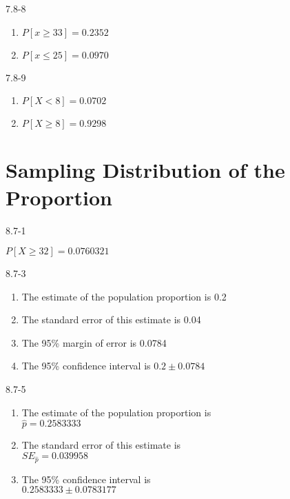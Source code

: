 \begin{exsol@solution}{7.8-8}



\begin{enumerate}
\item $P[ x \ge 33] = 0.2352$
\item $P[ x \le 25] = 0.0970$
\end{enumerate}

\end{exsol@solution}
\begin{exsol@solution}{7.8-9}
\begin{enumerate}
\item $P[ X < 8 ] = 0.0702$
\item $P[ X \ge 8 ] = 0.9298$
\end{enumerate}

\end{exsol@solution}
\setcounter{chapter}{7}\chapter{Sampling Distribution of the Proportion}
\begin{exsol@solution}{8.7-1}

    $P[ X \ge 32 ] = 0.0760321$
\end{exsol@solution}
\begin{exsol@solution}{8.7-3}
\begin{enumerate}
\item The estimate of the population proportion is 0.2
\item The standard error of this estimate is 0.04
\item The 95\% margin of error is 0.0784
\item The 95\% confidence interval is $0.2 \pm 0.0784$
\end{enumerate}

\end{exsol@solution}
\begin{exsol@solution}{8.7-5}
\begin{enumerate}
\item	The estimate of the population proportion is \\ $\hat{p} = 0.2583333$
\item	The standard error of this estimate is \\ $SE_{\hat{p}} = 0.039958$
\item	The 95\% confidence interval is \\ $0.2583333 \pm 0.0783177$
\end{enumerate}
\end{exsol@solution}
